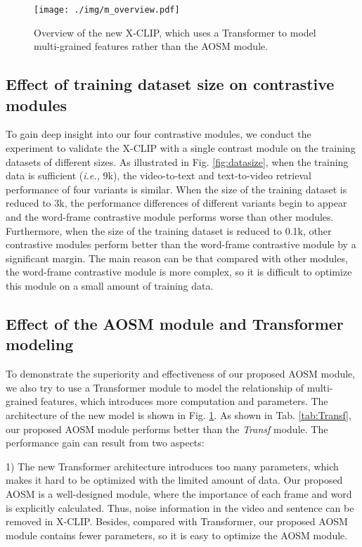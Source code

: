 \documentclass[sigconf]{acmart}
\begin{document}
\begin{figure}
\centering 
  \texttt{[image: ./img/m\_overview.pdf]}
  \caption{Overview of the new X-CLIP, which uses a Transformer to model multi-grained features rather than the AOSM module. }
  \label{fig:m_overview}
\end{figure}






\subsection{Effect of training dataset size on contrastive modules}

To gain deep insight into our four contrastive modules, we conduct the experiment to validate the X-CLIP with a single contrast module on the training datasets of different sizes. As illustrated in Fig. \ref{fig:datasize}, when the training data is sufficient (\emph{i.e.,} 9k), the video-to-text and text-to-video retrieval performance of four variants is similar. When the size of the training dataset is reduced to 3k, the performance differences of different variants begin to appear and the word-frame contrastive module performs worse than other modules. Furthermore, when the size of the training dataset is reduced to 0.1k, other contrastive modules perform better than the word-frame contrastive module by a significant margin. The main reason can be that compared with other modules, the word-frame contrastive module is more complex, so it is difficult to optimize this module on a small amount of training data.



\subsection{Effect of the AOSM module and Transformer modeling}     

To demonstrate the superiority and effectiveness of our proposed AOSM module, we also try to use a Transformer module to model the relationship of multi-grained features, which introduces more computation and parameters. The architecture of the new model is shown in Fig. \ref{fig:m_overview}. As shown in Tab. \ref{tab:Transf}, our proposed AOSM module performs better than the \emph{Transf} module. The performance gain can result from two aspects:

1) The new Transformer architecture introduces too many parameters, which makes it hard to be optimized with the limited amount of data. Our proposed AOSM is a well-designed module, where the importance of each frame and word is explicitly calculated. Thus, noise information in the video and sentence can be removed in X-CLIP. Besides, compared with Transformer, our proposed AOSM module contains fewer parameters, so it is easy to optimize the AOSM module.
\end{document}
